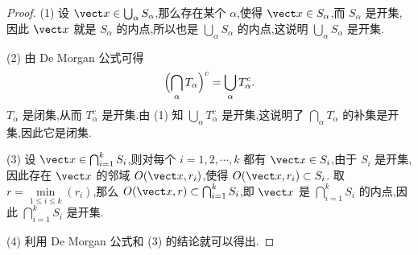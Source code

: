 \begin{proof}
(1) 设 $\vect x\in\bigcup_\alpha S_\alpha$,那么存在某个 $\alpha$,使得 $\vect x\in S_\alpha$,而 $S_\alpha$ 是开集,因此 $\vect x$ 就是 $S_\alpha$ 的内点,所以也是 $\bigcup_\alpha S_\alpha$ 的内点,这说明 $\bigcup_\alpha S_\alpha$ 是开集.

(2) 由 De Morgan 公式可得
\[
\Bigl(\bigcap_\alpha T_\alpha\Bigr)^c=\bigcup_\alpha T_\alpha^c.
\]
$T_\alpha$ 是闭集,从而 $T_\alpha^c$ 是开集.由 (1) 知 $\bigcup_\alpha T_\alpha^c$ 是开集,这说明了 $\bigcap_\alpha T_\alpha$ 的补集是开集,因此它是闭集.

(3) 设 $\vect x\in\bigcap_{i=1}^k S_i$,则对每个 $i=1,2,\cdots,k$ 都有 $\vect x\in S_i$,由于 $S_i$ 是开集,因此存在 $\vect x$ 的邻域 $O(\vect x,r_i)$,使得 $O(\vect x,r_i)\subset S_i$. 取 $r=\min\limits_{1\leq i\leq k}(r_i)$,那么 $O(\vect x,r)\subset\bigcap_{i=1}^k S_i$,即 $\vect x$ 是 $\bigcap_{i=1}^k S_i$ 的内点,因此 $\bigcap_{i=1}^k S_i$ 是开集.

(4) 利用 De Morgan 公式和 (3) 的结论就可以得出.
\end{proof}


